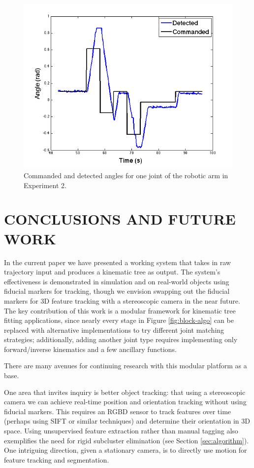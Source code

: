 \documentclass[letterpaper, 10 pt, conference]{ieeeconf}  %
\begin{document}
\begin{figure}[ht]
  \centering
  \includegraphics[width=.4\textwidth]{img/exp2b.png}
  \vspace{-.3in}
  \caption{Commanded and detected angles for one joint of the robotic arm in Experiment 2.}
  \label{fig:exp2}
\end{figure}

\section{CONCLUSIONS AND FUTURE WORK} \label{sec:conclusion}\label{sec:future}

In the current paper we have presented a working system that takes in raw trajectory input and produces a kinematic tree as output. The system's effectiveness is demonstrated in simulation and on real-world objects using fiducial markers for tracking, though we envision swapping out the fiducial markers for 3D feature tracking with a stereoscopic camera in the near future. The key contribution of this work is a modular framework for kinematic tree fitting applications, since nearly every stage in Figure \ref{fig:block-algo} can be replaced with alternative implementations to try different joint matching strategies; additionally, adding another joint type requires implementing only forward/inverse kinematics and a few ancillary functions.

There are many avenues for continuing research with this modular platform as a base. 

One area that invites inquiry is better object tracking: that using a stereoscopic camera we can achieve real-time position and orientation tracking without using fiducial markers. This requires an RGBD sensor to track features over time (perhaps using SIFT or similar techniques) and determine their orientation in 3D space. Using unsupervised feature extraction rather than manual tagging also exemplifies the need for rigid subcluster elimination (see Section \ref{sec:algorithm}). One intriguing direction, given a stationary camera, is to directly use motion for feature tracking and segmentation.
\end{document}
